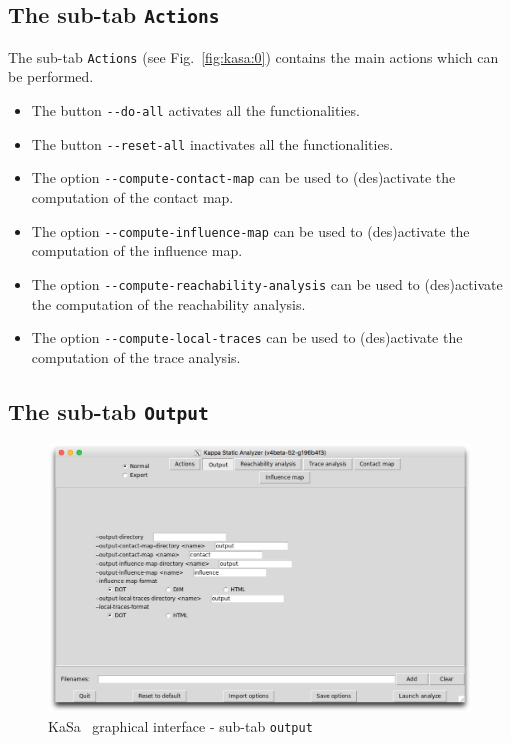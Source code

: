 \documentclass[11pt]{book}
\def\KaSa{\textsf{KaSa}}
\begin{document}
\subsection{The sub-tab \texttt{Actions}}

The sub-tab \texttt{Actions} (see Fig.~\ref{fig:kasa:0}) contains the main actions which can be performed.

\begin{itemize}
\item The button \texttt{-{}-do-all} activates all the functionalities.
\item The button \texttt{-{}-reset-all} inactivates all the functionalities.
\item The option \texttt{-{}-compute-contact-map} can be used to (des)activate the computation of the contact map.
\item The option \texttt{-{}-compute-influence-map} can be used to (des)activate the computation of the influence map.
\item The option \texttt{-{}-compute-reachability-analysis} can be used to (des)activate the computation of the reachability analysis.
\item The option \texttt{-{}-compute-local-traces} can be used to (des)activate the computation of the trace analysis.
\end{itemize}

\subsection{The sub-tab \texttt{Output}}

\begin{figure}[htbp]
\centering
\includegraphics[width=12cm,bb=0 0 1904 1208]{img/kasa_1.png}
\caption{\KaSa~ graphical interface - sub-tab \texttt{output}}
\label{fig:kasa:1}
\end{figure}
\end{document}
